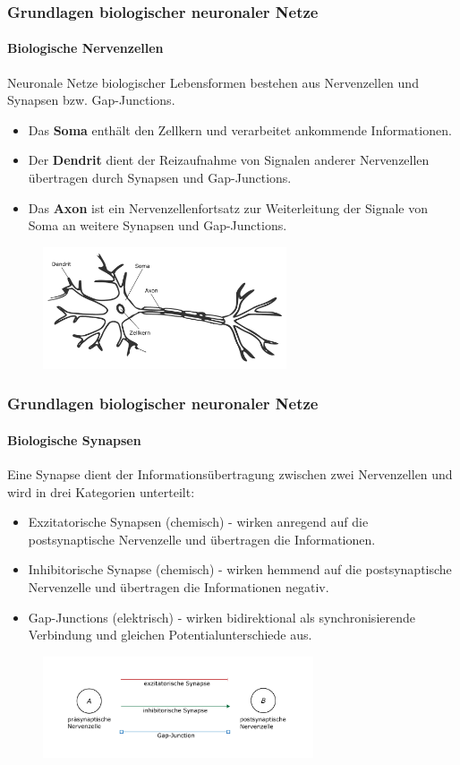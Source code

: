 \documentclass[10pt,t,aspectratio=1610]{beamer}
\newcommand{\ChapterBnn}{Grundlagen biologischer neuronaler Netze}
\begin{document}
\begin{frame}
	\frametitle{\ChapterBnn}
	\framesubtitle{Biologische Nervenzellen}
	\vspace{0.3cm}
	Neuronale Netze biologischer Lebensformen bestehen aus Nervenzellen und Synapsen bzw. Gap-Junctions.
	\vspace{0.2cm}
	\begin{itemize}
		\item Das \textbf{Soma} enthält den Zellkern und verarbeitet ankommende Informationen.
		\item Der \textbf{Dendrit} dient der Reizaufnahme von Signalen anderer Nervenzellen übertragen durch Synapsen und Gap-Junctions.
		\item Das \textbf{Axon} ist ein Nervenzellenfortsatz zur Weiterleitung der Signale von Soma an weitere Synapsen und Gap-Junctions.
	\end{itemize}
	\begin{figure}[H] %
		\centering
		\includegraphics[width=7.2cm]{figures/folie_2/neuron_is.pdf}
		\label{fig:neuron}
	\end{figure}

\end{frame}


\begin{frame}
	\frametitle{\ChapterBnn}
	\framesubtitle{Biologische Synapsen}
	\vspace{0.3cm}
	Eine Synapse dient der Informationsübertragung zwischen zwei Nervenzellen und wird in drei Kategorien unterteilt:
	\vspace{0.2cm}
	\begin{itemize}
		\item Exzitatorische Synapsen (chemisch) - wirken anregend auf die postsynaptische Nervenzelle und übertragen die Informationen.
		\item Inhibitorische Synapse (chemisch) - wirken  hemmend auf die postsynaptische Nervenzelle und übertragen die Informationen negativ.
		\item Gap-Junctions (elektrisch) - wirken bidirektional als synchronisierende Verbindung und gleichen Potentialunterschiede aus.
	\end{itemize}
	\begin{figure}[H] %
		\centering
		\includegraphics[width=8cm]{figures/folie_3/synapse_is.pdf}
		\label{fig:synapse}
	\end{figure}

\end{frame}
\end{document}
